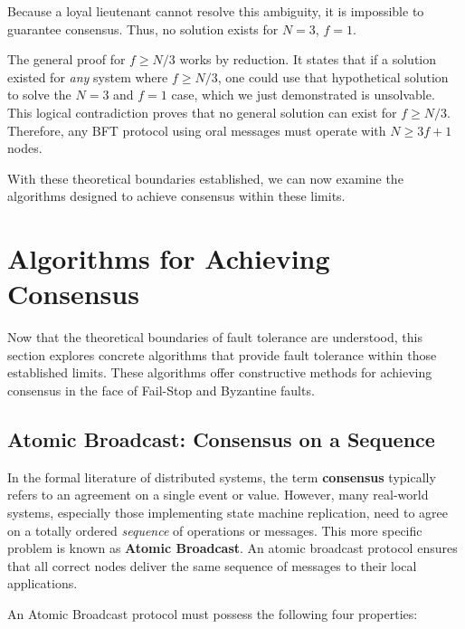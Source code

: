 \documentclass{scrbook}
\begin{document}
Because a loyal lieutenant cannot resolve this ambiguity, it is impossible to guarantee consensus. Thus, no solution exists for $N=3$, $f=1$.

The general proof for $f \geq N/3$ works by reduction. It states that if a
solution existed for \emph{any} system where $f \geq N/3$, one could use that hypothetical solution to solve the $N=3$ and $f=1$ case, which we just demonstrated is unsolvable. This logical contradiction proves that no general solution can exist for $f \geq N/3$. Therefore, any BFT protocol using oral messages must operate with $N \geq 3f + 1$ nodes.

With these theoretical boundaries established, we can now examine the
algorithms designed to achieve consensus within these limits.

\section{Algorithms for Achieving Consensus}

Now that the theoretical boundaries of fault tolerance are understood,
this section explores concrete algorithms that provide fault tolerance
within those established limits. These algorithms offer constructive
methods for achieving consensus in the face of Fail-Stop and Byzantine
faults.

\subsection{Atomic Broadcast: Consensus on a Sequence}

In the formal literature of distributed systems, the term
\textbf{consensus} typically refers to an agreement on a single event or
value. However, many real-world systems, especially those implementing
state machine replication, need to agree on a totally ordered
\emph{sequence} of operations or messages. This more specific problem is
known as \textbf{Atomic Broadcast}. An atomic broadcast protocol ensures
that all correct nodes deliver the same sequence of messages to their
local applications.

An Atomic Broadcast protocol must possess the following four properties:
\end{document}
